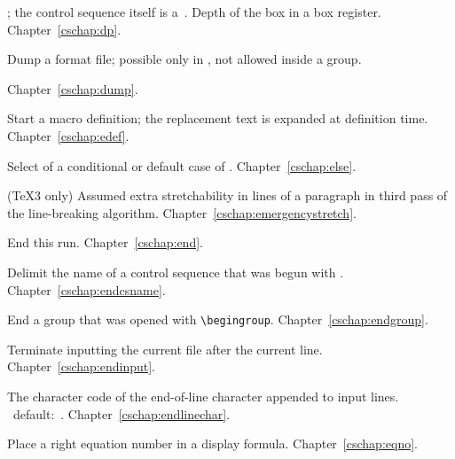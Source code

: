 \begin{glossinventory}
\item [\cs{dp\gr{8-bit number}}]
      ; the control sequence itself
      is a~.
      Depth of the box in a box register. 
Chapter~\ref{cschap:dp}.

\item [\cs{dump}]
      Dump a format file; possible only in \IniTeX, 
      not allowed inside a group.

Chapter~\ref{cschap:dump}.

\item [\cs{edef}]
      Start a macro definition; 
      the replacement text is expanded at definition time.
Chapter~\ref{cschap:edef}.

\item [\cs{else}]
      Select
       of a conditional 
      or default case of .
Chapter~\ref{cschap:else}.

\item [\cs{emergencystretch}]
      (\TeX3 only) 
      Assumed extra stretchability in lines of a paragraph
      in third pass of the line-breaking algorithm.
Chapter~\ref{cschap:emergencystretch}.

\item [\cs{end}]
      End this run.
Chapter~\ref{cschap:end}.

\item [\cs{endcsname}]
      Delimit the name of a control sequence that was begun
      with .
Chapter~\ref{cschap:endcsname}.

\item [\cs{endgroup}]
      End a group that was opened with \verb-\begingroup-.
Chapter~\ref{cschap:endgroup}.

\item [\cs{endinput}]
      Terminate inputting the current file after the current line.
Chapter~\ref{cschap:endinput}.

\item [\cs{endlinechar}] 
      The character code of the end-of-line character 
      appended to input lines.
      \IniTeX\ default:~.
Chapter~\ref{cschap:endlinechar}.

\item [\cs{eqno\gr{math mode material}\n{\char36\char36}}]
      Place a right equation number in a display formula.
Chapter~\ref{cschap:eqno}.


\end{glossinventory}
